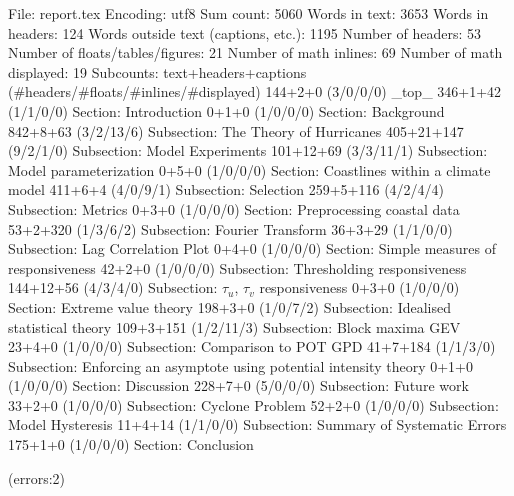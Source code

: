 
File: report.tex
Encoding: utf8
Sum count: 5060
Words in text: 3653
Words in headers: 124
Words outside text (captions, etc.): 1195
Number of headers: 53
Number of floats/tables/figures: 21
Number of math inlines: 69
Number of math displayed: 19
Subcounts:
  text+headers+captions (#headers/#floats/#inlines/#displayed)
  144+2+0 (3/0/0/0) _top_
  346+1+42 (1/1/0/0) Section: Introduction
  0+1+0 (1/0/0/0) Section: Background
  842+8+63 (3/2/13/6) Subsection: The Theory of Hurricanes
  405+21+147 (9/2/1/0) Subsection: Model Experiments
  101+12+69 (3/3/11/1) Subsection: Model parameterization
  0+5+0 (1/0/0/0) Section: Coastlines within a climate model
  411+6+4 (4/0/9/1) Subsection: Selection
  259+5+116 (4/2/4/4) Subsection: Metrics
  0+3+0 (1/0/0/0) Section: Preprocessing coastal data
  53+2+320 (1/3/6/2) Subsection: Fourier Transform
  36+3+29 (1/1/0/0) Subsection: Lag Correlation Plot
  0+4+0 (1/0/0/0) Section: Simple measures of responsiveness
  42+2+0 (1/0/0/0) Subsection: Thresholding responsiveness
  144+12+56 (4/3/4/0) Subsection: $\tau_u$, $\tau_v$ responsiveness
  0+3+0 (1/0/0/0) Section: Extreme value theory
  198+3+0 (1/0/7/2) Subsection: Idealised statistical theory
  109+3+151 (1/2/11/3) Subsection: Block maxima GEV
  23+4+0 (1/0/0/0) Subsection: Comparison to POT GPD
  41+7+184 (1/1/3/0) Subsection: Enforcing an asymptote using potential intensity theory 
  0+1+0 (1/0/0/0) Section: Discussion
  228+7+0 (5/0/0/0) Subsection: Future work
  33+2+0 (1/0/0/0) Subsection: Cyclone Problem
  52+2+0 (1/0/0/0) Subsection: Model Hysteresis
  11+4+14 (1/1/0/0) Subsection: Summary of Systematic Errors
  175+1+0 (1/0/0/0) Section: Conclusion

(errors:2)
